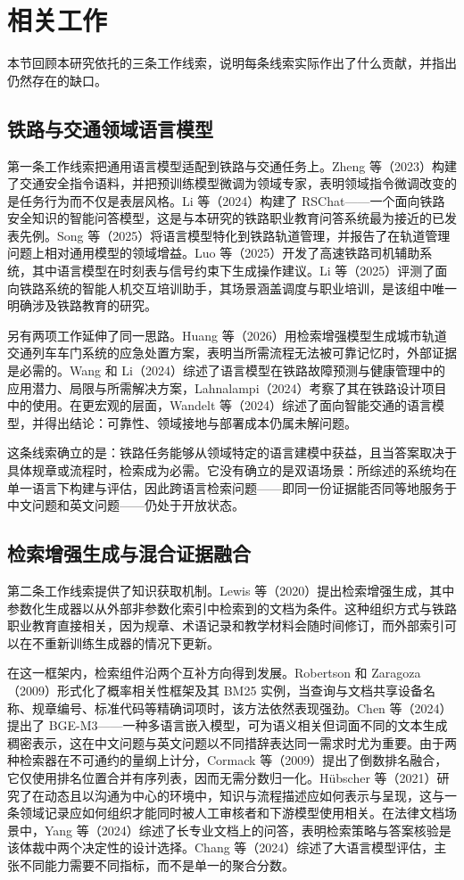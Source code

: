 \documentclass{article}
\begin{document}
\section{相关工作}

本节回顾本研究依托的三条工作线索，说明每条线索实际作出了什么贡献，并指出仍然存在的缺口。

\subsection{铁路与交通领域语言模型}

第一条工作线索把通用语言模型适配到铁路与交通任务上。Zheng 等（2023）构建了交通安全指令语料，并把预训练模型微调为领域专家，表明领域指令微调改变的是任务行为而不仅是表层风格。Li 等（2024）构建了 RSChat——一个面向铁路安全知识的智能问答模型，这是与本研究的铁路职业教育问答系统最为接近的已发表先例。Song 等（2025）将语言模型特化到铁路轨道管理，并报告了在轨道管理问题上相对通用模型的领域增益。Luo 等（2025）开发了高速铁路司机辅助系统，其中语言模型在时刻表与信号约束下生成操作建议。Li 等（2025）评测了面向铁路系统的智能人机交互培训助手，其场景涵盖调度与职业培训，是该组中唯一明确涉及铁路教育的研究。

另有两项工作延伸了同一思路。Huang 等（2026）用检索增强模型生成城市轨道交通列车车门系统的应急处置方案，表明当所需流程无法被可靠记忆时，外部证据是必需的。Wang 和 Li（2024）综述了语言模型在铁路故障预测与健康管理中的应用潜力、局限与所需解决方案，Lahnalampi（2024）考察了其在铁路设计项目中的使用。在更宏观的层面，Wandelt 等（2024）综述了面向智能交通的语言模型，并得出结论：可靠性、领域接地与部署成本仍属未解问题。

这条线索确立的是：铁路任务能够从领域特定的语言建模中获益，且当答案取决于具体规章或流程时，检索成为必需。它没有确立的是双语场景：所综述的系统均在单一语言下构建与评估，因此跨语言检索问题——即同一份证据能否同等地服务于中文问题和英文问题——仍处于开放状态。

\subsection{检索增强生成与混合证据融合}

第二条工作线索提供了知识获取机制。Lewis 等（2020）提出检索增强生成，其中参数化生成器以从外部非参数化索引中检索到的文档为条件。这种组织方式与铁路职业教育直接相关，因为规章、术语记录和教学材料会随时间修订，而外部索引可以在不重新训练生成器的情况下更新。

在这一框架内，检索组件沿两个互补方向得到发展。Robertson 和 Zaragoza（2009）形式化了概率相关性框架及其 BM25 实例，当查询与文档共享设备名称、规章编号、标准代码等精确词项时，该方法依然表现强劲。Chen 等（2024）提出了 BGE-M3——一种多语言嵌入模型，可为语义相关但词面不同的文本生成稠密表示，这在中文问题与英文问题以不同措辞表达同一需求时尤为重要。由于两种检索器在不可通约的量纲上计分，Cormack 等（2009）提出了倒数排名融合，它仅使用排名位置合并有序列表，因而无需分数归一化。Hübscher 等（2021）研究了在动态且以沟通为中心的环境中，知识与流程描述应如何表示与呈现，这与一条领域记录应如何组织才能同时被人工审核者和下游模型使用相关。在法律文档场景中，Yang 等（2024）综述了长专业文档上的问答，表明检索策略与答案核验是该体裁中两个决定性的设计选择。Chang 等（2024）综述了大语言模型评估，主张不同能力需要不同指标，而不是单一的聚合分数。
\end{document}
